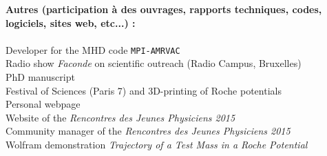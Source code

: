 \documentclass[11pt]{article}
\begin{document}
{\bf Autres (participation \`a des ouvrages, rapports techniques, codes, logiciels, sites web, etc...) :}\\ \\
 Developer for the MHD code \texttt{MPI-AMRVAC}\\ 
 Radio show \emph{Faconde} on scientific outreach (Radio Campus, Bruxelles)\\ 
 PhD manuscript\\ 
 Festival of Sciences (Paris 7) and 3D-printing of Roche potentials \\ 
 Personal webpage\\ 
 Website of the \emph{Rencontres des Jeunes Physiciens 2015}\\ 
 Community manager of the \emph{Rencontres des Jeunes Physiciens 2015}\\ 
 Wolfram demonstration \textit{Trajectory of a Test Mass in a Roche Potential}\\

\vspace{0.3cm}
\end{document}

